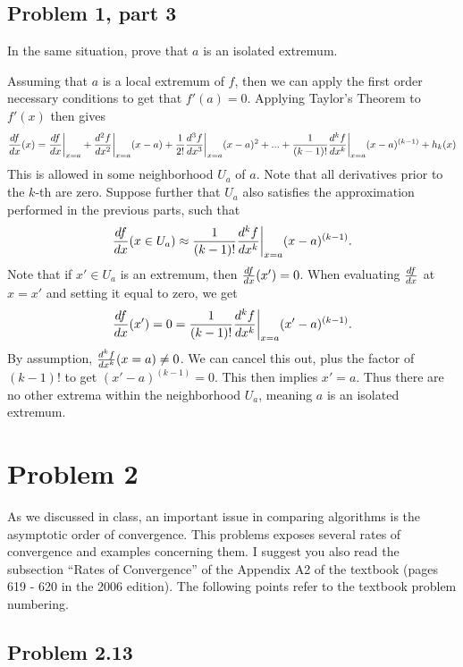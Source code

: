 \newpage
\subsection{Problem 1, part 3}
In the same situation, prove that $a$ is an isolated extremum.
\partbreak
\begin{solution}

    Assuming that $a$ is a local extremum of $f$, then we can apply the first order necessary conditions to get that $f'(a) = 0$. Applying Taylor's Theorem to $f'(x)$ then gives
    \[
    \deriv{f}{x}{1} (x) = \deriv{f}{x}{1} \bigg|_{x = a} + \deriv{f}{x}{2}\bigg|_{x = a} (x - a) + \frac{1}{2!}\deriv{f}{x}{3}\bigg|_{x = a} (x - a)^2 + ... + \frac{1}{(k-1)!}\deriv{f}{x}{k} \bigg|_{x = a} (x - a)^{(k-1)} + h_k(x) 
    \]
    This is allowed in some neighborhood $U_a$ of $a$. Note that all derivatives prior to the $k$-th are zero. Suppose further that $U_a$ also satisfies the approximation performed in the previous parts, such that
    \[
    \deriv{f}{x}{1} (x \in U_a) \approx \frac{1}{(k-1)!}\deriv{f}{x}{k} \bigg|_{x = a}(x - a)^{(k-1)} .
    \]
    Note that if $x' \in U_a$ is an extremum, then $\deriv{f}{x}{1}(x') = 0$. When evaluating $\deriv{f}{x}{1}$ at $x = x'$ and setting it equal to zero, we get
    \[
    \deriv{f}{x}{1}(x') = 0 = \frac{1}{(k-1)!}\deriv{f}{x}{k} \bigg|_{x = a}(x' - a)^{(k-1)}.
    \]
    By assumption, $\deriv{f}{x}{k} (x = a) \neq 0$. We can cancel this out, plus the factor of $(k-1)!$ to get $(x' - a)^{(k-1)} = 0$. This then implies $x' = a$. Thus there are no other extrema within the neighborhood $U_a$, meaning $a$ is an isolated extremum. 
\end{solution}

\newpage
\section{Problem 2}
 As we discussed in class, an important issue in comparing algorithms is the asymptotic order of convergence. This problems exposes several rates of convergence and examples concerning them. I suggest you also read the subsection ``Rates of Convergence” of the Appendix A2 of the textbook (pages 619 - 620 in the 2006 edition). The following points refer to the textbook problem numbering. 
 \subsection{Problem 2.13}
 
